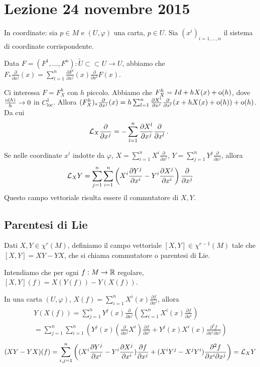 \chapter{Lezione 24 novembre 2015}

In coordinate: sia $p\in M$ e $(U,\varphi)$ una carta, $p\in U$. Sia $(x^i)_{i=1,\ldots,n}$ il sistema di coordinate corrispondente.

Data $F=(F^1,\ldots,F^n):\tilde U \subset\subset U \to U$, abbiamo che $F_*\frac\partial{\partial x^j}(x)=\sum_{l=1}^n \frac{\partial F^l}{\partial x^j}(x)\frac\partial{\partial x^l}F(x)$.

Ci interessa $F=F_X^h$ con $h$ piccolo. Abbiamo che $F_X^h=Id+hX(x)+\mathrm{o}(h)$, dove $\frac{\mathrm{o}(h)}{h}\to 0$ in $C^1_{\text{loc}}$.
Allora $(F_X^h)_*\frac\partial{\partial x^j}(x)=h\sum_{l=1}^n \frac{\partial X^l}{\partial x^j}\frac\partial{\partial x^l}(x+hX(x)+\mathrm{o}(h))+\mathrm{o}(h)$.
Da cui
\begin{equation*}
	\mathcal L_X\frac\partial{\partial x^j}=-\sum_{l=1}^n \frac{\partial X^l}{\partial x^j}\frac\partial{\partial x^l}\, \text{. }
\end{equation*}

Se nelle coordinate $x^i$ indotte da $\varphi$, $X=\sum_{i=1}^n X^i\frac\partial{\partial x^i}$, $Y=\sum_{j=1}^n Y^j\frac\partial{\partial x^j}$, allora
\begin{equation*}
	\mathcal L_XY=\sum_{j=1}^n\sum_{i=1}^n \left(X^i\frac{\partial Y^j}{\partial x^i}-Y^i\frac{\partial X^j}{\partial x^i}\right)\frac\partial{\partial x^j}
\end{equation*}
Questo campo vettoriale risulta essere il commutatore di $X,Y$.

\section{Parentesi di Lie}
\begin{definition}
Dati $X,Y\in\chi^r(M)$, definiamo il campo vettoriale $[X,Y]\in\chi^{r-1}(M)$ tale che $[X,Y]=XY-YX$, che si chiama commutatore o parentesi di Lie.

Intendiamo che per ogni $f:M\to\mathbb R$ regolare, $[X,Y](f)=X(Y(f))-Y(X(f))$.
\end{definition}

In una carta $(U,\varphi)$, $X(f)=\sum_{i=1}^n X^i(x)\frac{\partial f}{\partial x^i}$, allora
\begin{multline*}
	Y(X(f))=\sum_{j=1}^nY^j(x)\frac\partial{\partial x^j}\left( \sum_{i=1}^n X^i(x)\frac{\partial f}{\partial x^i} \right)\\
	= \sum_{j=1}^n \sum_{i=1}^n \left( Y^j(x) (\frac{\partial}{\partial x^j}X^i)\frac{\partial f}{\partial x^i} +Y^j(x)X^i(x)\frac{\partial^2 f}{\partial x^i\partial x^j} \right)
\end{multline*}
\begin{equation*}
	(XY-YX)(f)=\sum_{i,j=1}^n\left((X^i\frac{\partial Y^j}{\partial x^i}-Y^i\frac{\partial X^j}{\partial x^i})\frac{\partial f}{\partial x^j} +(X^iY^j-X^jY^i)\frac{\partial^2 f}{\partial x^i\partial x^j}  \right)=\mathcal L_XY
\end{equation*}

